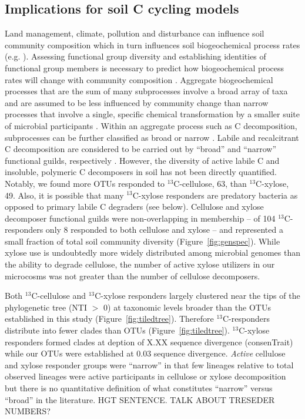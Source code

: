 \subsection{Implications for soil C cycling models}
Land management, climate, pollution and disturbance can influence soil
community composition \citep{McGuire2010} which in turn influences soil
biogeochemical process rates (e.g. \citep{Berlemont2014a}). Assessing
functional group diversity and establishing identities of functional group
members is necessary to predict how biogeochemical process rates will change
with community composition \citep{Schimel_1995,McGuire2010}. Aggregate
biogeochemical processes that are the sum of many subprocesses involve a broad
array of taxa and are assumed to be less influenced by community change than
narrow processes that involve a single, specific chemical transformation by
a smaller suite of microbial participants \citep{Schimel_1995,McGuire2010}.
Within an aggregate process such as C decomposition, subprocesses can be
further classified as broad or narrow \citep{McGuire2010}. Labile and
recalcitrant C decomposition are considered to be carried out by ``broad'' and
``narrow'' functional guilds, respectively \citep{McGuire2010}. However, the
diversity of active labile C and insoluble, polymeric C decomposers in soil has
not been directly quantified. Notably, we found more OTUs responded to
$^{13}$C-cellulose, 63, than $^{13}$C-xylose, 49. Also, it is possible that
many $^{13}$C-xylose responders are predatory bacteria as opposed to primary
labile C degraders (see below). Cellulose and xylose decomposer functional
guilds were non-overlapping in membership -- of
104 $^{13}$C-responders only 8 responded to both cellulose and xylose -- and
represented a small fraction of total soil community diversity
(Figure~\ref{fig:genspec}). While xylose use is undoubtedly more widely
distributed among microbial genomes than the ability to
degrade cellulose, the number of active xylose utilizers in our microcosms was
not greater than the number of cellulose decomposers.

Both $^{13}$C-cellulose and $^{13}$C-xylose responders largely clustered
near the tips of the phylogenetic tree (NTI $>$ 0) at taxonomic levels broader
than the OTUs established in this study (Figure~\ref{fig:tiledtree}). Therefore
$^{13}$C-responders distribute into fewer clades than OTUs
(Figure~\ref{fig:tiledtree}). $^{13}$C-xylose responders formed clades at
deption of X.XX sequence divergence (consenTrait) while our OTUs were
established at 0.03 sequence divergence. \textit{Active} cellulose and
xylose responder groups were ``narrow'' in that few lineages relative to total
observed lineages were active participants in cellulose or xylose decomposition
but there is no quantitative definition of what constitutes ``narrow'' versus
``broad'' in the literature. HGT SENTENCE. TALK ABOUT TRESEDER NUMBERS?

